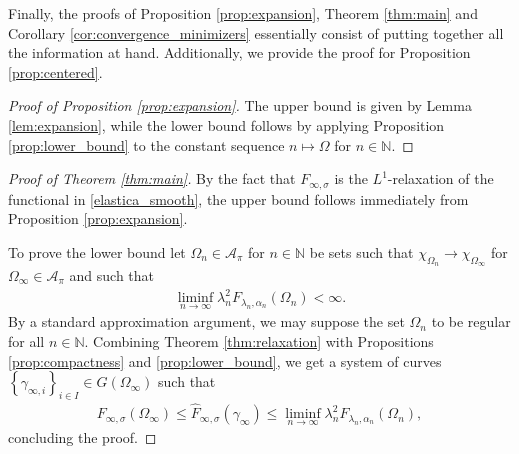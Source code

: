 \documentclass[11pt]{article}
\numberwithin{statement}{section}
\numberwithin{equation}{section}
\theoremstyle{remark}
\newcommand{\N}{\mathbb N}
\begin{document}
Finally, the proofs of Proposition \ref{prop:expansion}, Theorem
\ref{thm:main} and Corollary \ref{cor:convergence_minimizers}
essentially consist of putting together all the information at hand.
Additionally, we provide the proof for Proposition
\ref{prop:centered}.

\begin{proof}[Proof of Proposition \ref{prop:expansion}]
  The upper bound is given by Lemma \ref{lem:expansion}, while the
  lower bound follows by applying Proposition \ref{prop:lower_bound}
  to the constant sequence $n \mapsto \Omega$ for $n \in \N$.
\end{proof}


\begin{proof}[Proof of Theorem \ref{thm:main}]
  By the fact that $F_{\infty,\sigma}$ is the $L^1$-relaxation of the
  functional in \eqref{elastica_smooth}, the upper bound follows
  immediately from Proposition \ref{prop:expansion}.
	
  To prove the lower bound let $\Omega_n \in \mathcal{A}_\pi$ for
  $n \in \N$ be sets such that
  $\chi_{\Omega_n} \to \chi_{\Omega_\infty}$ for
  $\Omega_\infty \in \mathcal{A}_\pi$ and such that
	\begin{align}
		\liminf_{n\to \infty} \lambda_n^2 F_{\lambda_n,\alpha_n}(\Omega_n) <\infty.
	\end{align}
	By a standard approximation argument, we may suppose the set
        $\Omega_n$ to be regular for all $n \in \N$.  Combining
        Theorem \ref{thm:relaxation} with Propositions
        \ref{prop:compactness} and \ref{prop:lower_bound}, we get a
        system of curves
        $\left\{\gamma_{\infty,i}\right\}_{i\in I} \in
        G(\Omega_\infty)$ such that
	\begin{align}
          F_{\infty, \sigma}(\Omega_\infty) \leq \hat
          F_{\infty,\sigma}(\gamma_\infty) \leq \liminf_{n\to \infty}
          \lambda_n^2 F_{\lambda_n,\alpha_n}(\Omega_n), 
	\end{align}
	concluding the proof.
\end{proof}
\end{document}
